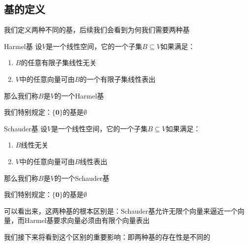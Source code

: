 \documentclass[12pt, a4paper, oneside, UTF8]{ctexbook}
\begin{document}
		\subsection{基的定义}
			我们定义两种不同的基，后续我们会看到为何我们需要两种基
			\begin{defn}{Harmel基}{}
				设$V$是一个线性空间，它的一个子集$B \subseteq V$如果满足：
				\begin{enumerate}
					\item $B$的任意有限子集线性无关
					\item $V$中的任意向量可由$B$的一个有限子集线性表出
				\end{enumerate}
				那么我们称$B$是$V$的一个Harmel基

				我们特别规定：$\{\mathbf{0}\}$的基是$\emptyset$
			\end{defn}
			\begin{defn}{Schauder基}{}
				设$V$是一个线性空间，它的一个子集$B \subseteq V$如果满足：
				\begin{enumerate}
					\item $B$线性无关
					\item $V$中的任意向量可由$B$线性表出
				\end{enumerate}
				那么我们称$B$是$V$的一个Schauder基

				我们特别规定：$\{\mathbf{0}\}$的基是$\emptyset$
			\end{defn}
			可以看出来，这两种基的根本区别是：Schauder基允许无限个向量来逼近一个向量，而Harmel基要求向量必须由有限个向量表出
			
			我们接下来将看到这个区别的重要影响：即两种基的存在性是不同的
\end{document}
